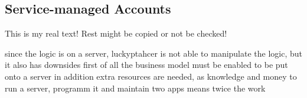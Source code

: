 \subsection{Service-managed Accounts} \label{subsection:evaluation-external-service}
This is my real text! Rest might be copied or not be checked!

since the logic is on a server, luckyptahcer is not able to manipulate the logic, but it also has downsides
first of all the business model must be enabled to be put onto a server
in addition extra resources are needed, as knowledge and money to run a server, programm it and maintain two apps means twice the work
